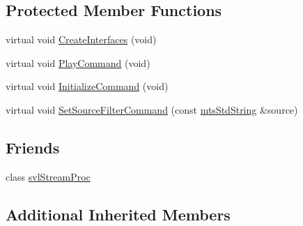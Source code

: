 \subsection*{Protected Member Functions}
\begin{DoxyCompactItemize}
\item 
virtual void \hyperlink{classsvl_stream_manager_ab10a3b3ef0c290a0c455f7f6aaef91ba}{Create\-Interfaces} (void)
\item 
virtual void \hyperlink{classsvl_stream_manager_a530c56aceb9cd1d93fddd75715ece8fc}{Play\-Command} (void)
\item 
virtual void \hyperlink{classsvl_stream_manager_ad58ece1ed1cb4149024ee7b605f8ae17}{Initialize\-Command} (void)
\item 
virtual void \hyperlink{classsvl_stream_manager_af89d94646fba67c06df3aa7a72cf09af}{Set\-Source\-Filter\-Command} (const \hyperlink{mts_generic_object_proxy_8h_adbc21bfbf98367e582bf8a263b7e711f}{mts\-Std\-String} \&source)
\end{DoxyCompactItemize}
\subsection*{Friends}
\begin{DoxyCompactItemize}
\item 
class \hyperlink{classsvl_stream_manager_a6a9ee1dec5ca263793dca09411295245}{svl\-Stream\-Proc}
\end{DoxyCompactItemize}
\subsection*{Additional Inherited Members}


